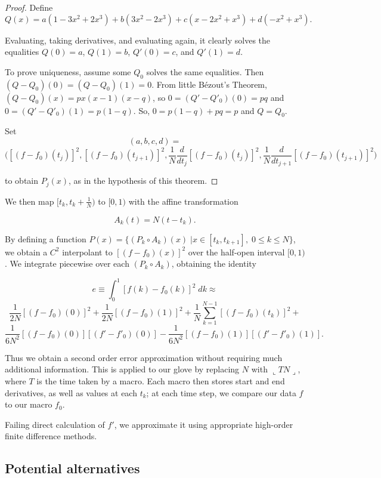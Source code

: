 \documentclass{article}
\begin{document}
	\begin{proof}
		Define 
		$$Q(x)=a(1-3x^2+2x^3)+b(3x^2-2x^3)+c(x-2x^2+x^3)+d(-x^2+x^3).$$
		
		Evaluating, taking derivatives, and evaluating again, it clearly solves the equalities $Q(0)=a$, $Q(1)=b$, $Q'(0)=c$, and $Q'(1)=d$. 
		
		To prove uniqueness, assume some $Q_0$ solves the same equalities. Then $(Q-Q_0)(0)=(Q-Q_0)(1)=0$. From little B\'{e}zout's Theorem, $(Q-Q_0)(x)=px(x-1)(x-q)$, so $0=(Q'-Q'_0)(0)=pq$ and $0=(Q'-Q'_0)(1)=p(1-q)$. So, $0=p(1-q)+pq=p$ and $Q=Q_0$.
		
		Set $$(a,b,c,d)=$$
		$$\big([(f-f_0)(t_j)]^2,[(f-f_0)(t_{j+1})]^2,\frac{1}{N}\frac{d}{dt_j}[(f-f_0)(t_j)]^2,\frac{1}{N}\frac{d}{dt_{j+1}}[(f-f_0)(t_{j+1})]^2\big)$$
		
		to obtain $P_j(x)$, as in the hypothesis of this theorem.
	\end{proof}

	We then map $[t_k,t_k +\frac{1}{N})$ to $[0,1)$ with the affine transformation 
	
	$$A_k(t)=N(t-t_k).$$
	
	By defining a function $P(x)=\{(P_k\circ A_k)(x) \; | x \in [t_k,t_{k+1}], \;0\leq k \leq N \}$, we obtain a $C^2$ interpolant to $[(f-f_0)(x)]^2$ over the half-open interval $[0,1)$. We integrate piecewise over each $(P_k\circ A_k)$, obtaining the identity

	$$ e \equiv \int_0^1 [f(k)-f_0(k)]^2\;dk \approx$$
	\begin{equation}\frac{1}{2N}[(f-f_0)(0)]^2+\frac{1}{2N}[(f-f_0)(1)]^2+\frac{1}{N}\sum\limits_{k=1}^{N-1} [(f-f_0)(t_k)]^2 + \end{equation}
	$$ \frac{1}{6N^2}[(f-f_0)(0)][(f'-f'_0)(0)] - \frac{1}{6N^2}[(f-f_0)(1)][(f'-f'_0)(1)] .$$
	
	Thus we obtain a second order error approximation without requiring much additional information. This is applied to our glove by replacing $N$ with $\llcorner TN \lrcorner$, where $T$ is the time taken by a macro. Each macro then stores start and end derivatives, as well as values at each $t_k$; at each time step, we compare our data $f$ to our macro $f_0$.
	
	Failing direct calculation of $f'$, we approximate it using appropriate high-order finite difference methods.
	
	\subsection*{Potential alternatives}
	
\end{document}
